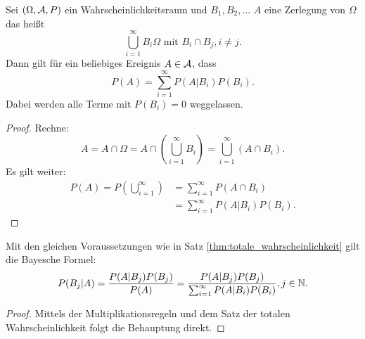 \begin{theorem}
    \label{thm:totale_wahrscheinlichkeit}
    Sei $(\Omega, \mathcal{A},P)$ ein Wahrscheinlichkeitsraum und $B_1,B_2,\ldots$ $A$ eine Zerlegung von $\Omega$ das heißt \[
        \bigcup_{i=1}^{\infty}B_{i} \Omega \text{ mit } B_i \cap B_j , i\neq j
    .\]    
    Dann gilt für ein beliebiges Ereignis $A \in \mathcal{A}$, dass \[
    P(A)=\sum_{i=1}^{\infty} P(A |B_i)P(B_i)
    .\]  
    Dabei werden alle Terme mit $P(B_i)=0$ weggelassen.
\end{theorem}
\begin{proof}
Rechne: \[
    A = A \cap \Omega = A \cap  (\bigcup_{i=1}^{\infty}B_i)= \bigcup_{i=1}^{\infty} (A \cap B_i)
.\]
Es gilt weiter:
\begin{align*}
    P(A)= P(\bigcup_{i=1}^{\infty}) &= \sum_{i=1}^{\infty} P(A \cap B_i) \\
                                    &= \sum_{i=1}^{\infty} P(A|B_i) P(B_i)
.\end{align*}
\end{proof}


\begin{theorem}
     Mit den gleichen Voraussetzungen wie in Satz \ref{thm:totale_wahrscheinlichkeit} gilt die Bayesche Formel: \[
    P(B_j|A)= \frac{P(A|B_j) P(B_j)}{P(A)}= \frac{P(A|B_j)P(B_j)}{\sum_{i=1}^{\infty} P(A|B_i)P(B_i)},j \in \mathbb{N}
    .\] 
\end{theorem}
\begin{proof}
Mittels der Multiplikationsregeln und dem Satz der totalen Wahrscheinlichkeit folgt die Behauptung direkt.
\end{proof}

